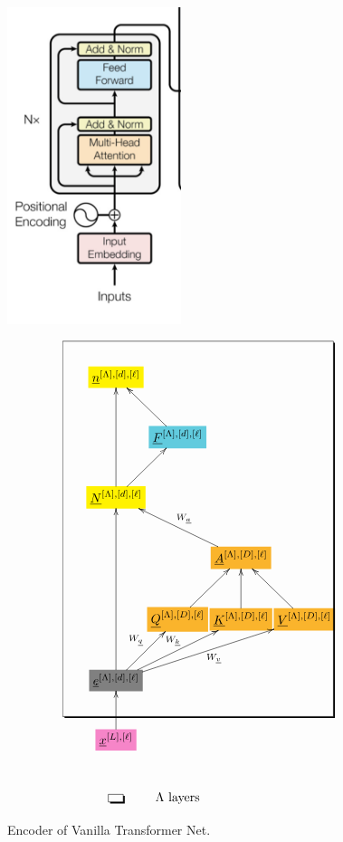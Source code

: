 \documentclass[12pt]{article}
\begin{document}
\begin{figure}[h!]\centering
\begin{minipage}{.4\linewidth}
\includegraphics[width=2in]{encoder.jpg}
\end{minipage}%
\begin{minipage}{.6\linewidth}
$$\xymatrix@R=2.5pc@C=0.1pc{
*+[F*:yellow]{\underline{n}^{[\Lambda],[d], [\ell]}}&&&
\\
&*+[F*:SkyBlue]{\underline{F}^{[\Lambda],[d], [\ell]}}\ar[ul]&&
\\
*+[F*:yellow]{\underline{N}^{[\Lambda],[d], [\ell]}}\ar[ur]\ar[uu]&&&
\\
&&*+[F*:Dandelion]{\underline{A}^{[\Lambda],[D], [\ell]}}\ar[ull]_{W_\rva}&
\\
&*+[F*:Dandelion]{\underline{Q}^{[\Lambda],[D], [\ell]}}\ar[ur]&*+[F*:Dandelion]{\underline{K}^{[\Lambda],[D], [\ell]}}\ar[u]&*+[F*:Dandelion]{\underline{V}^{[\Lambda],[D], [\ell]}}\ar[ul]
\\
*+[F*:gray]{\underline{e}^{[\Lambda],[d], [\ell]}}\ar[urr]^{W_\rvk}\ar[uuu]\ar[ur]^{W_\rvq}\ar[urrr]_{W_\rvv}&&&
\\
*+[F*:Lavender]{\underline{x}^{[L],[\ell]}}\ar[u]&&&
\save
\POS"1,1"."6,1"."1,4"."6,4"!C*+<4.0em>\frm{-,}
\restore
\\
*+[F-,]{\;\;}&\text{$\Lambda$ layers}
}$$
\end{minipage}
\caption{Encoder of Vanilla Transformer Net.}
\label{fig-texnn-for-encoder}
\end{figure}
\end{document}
